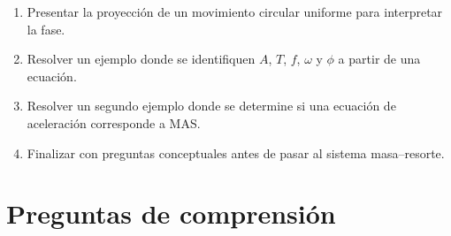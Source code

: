 \begin{notapedagogica}
\begin{enumerate}
    \item Presentar la proyección de un movimiento circular uniforme para interpretar la fase.

    \item Resolver un ejemplo donde se identifiquen \(A\), \(T\), \(f\), \(\omega\) y \(\phi\) a partir de una ecuación.

    \item Resolver un segundo ejemplo donde se determine si una ecuación de aceleración corresponde a MAS.

    \item Finalizar con preguntas conceptuales antes de pasar al sistema masa--resorte.
\end{enumerate}
\end{notapedagogica}

\section{Preguntas de comprensión}

